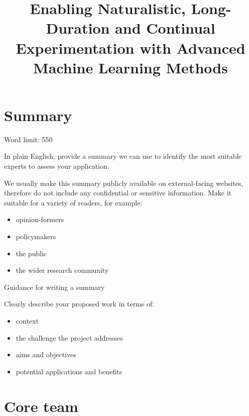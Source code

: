 \documentclass[11pt]{article}
\title{Enabling Naturalistic, Long-Duration and Continual Experimentation with
Advanced Machine Learning Methods}
\newenvironment{instruction}{%
    \begin{tcolorbox}[breakable,colback=red!5,colframe=red,title=Instruction]%
	}{%
    	\end{tcolorbox}%
	}
\begin{document}
\tableofcontents

\pagebreak

\section{Summary}

\begin{instruction}
Word limit: 550

In plain English, provide a summary we can use to identify the most suitable
experts to assess your application.

We usually make this summary publicly available on external-facing websites,
therefore do not include any confidential or sensitive information. Make it
suitable for a variety of readers, for example:

\begin{itemize}
	\item opinion-formers
	\item policymakers
	\item the public
	\item the wider research community
\end{itemize}

Guidance for writing a summary

Clearly describe your proposed work in terms of:

\begin{itemize}
	\item context
	\item the challenge the project addresses
	\item aims and objectives
	\item potential applications and benefits
\end{itemize}

\end{instruction}

% 

\pagebreak
\section{Core team}
\end{document}

